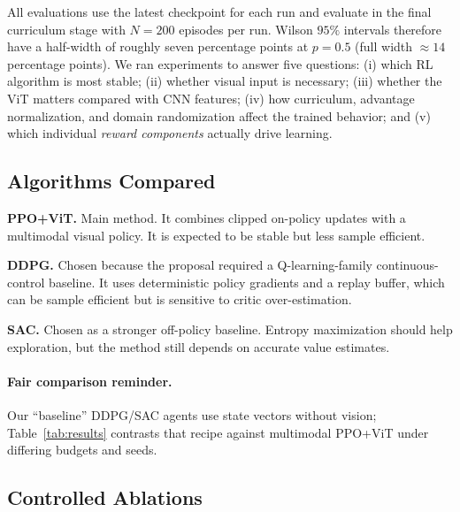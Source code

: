 \documentclass[twocolumn,a4paper,10pt]{article}
\begin{document}
All evaluations use the latest checkpoint for each run and evaluate in the
final curriculum stage with $N\!=\!200$ episodes per run.  Wilson $95\%$
intervals therefore have a half-width of roughly seven percentage points at
$p\!=\!0.5$ (full width $\approx\!14$ percentage points).  We ran experiments
to answer five questions: (i) which RL
algorithm is most stable; (ii) whether visual input is necessary; (iii)
whether the ViT matters compared with CNN features; (iv) how curriculum,
advantage normalization, and domain randomization affect the trained
behavior; and (v) which individual \emph{reward components} actually drive
learning.

\subsection{Algorithms Compared}

\textbf{PPO+ViT.}
Main method.  It combines clipped on-policy updates with a multimodal visual
policy.  It is expected to be stable but less sample efficient.

\textbf{DDPG.}
Chosen because the proposal required a Q-learning-family continuous-control
baseline.  It uses deterministic policy gradients and a replay buffer, which
can be sample efficient but is sensitive to critic over-estimation.

\textbf{SAC.}
Chosen as a stronger off-policy baseline.  Entropy maximization should help
exploration, but the method still depends on accurate value estimates.

\paragraph{Fair comparison reminder.}
Our ``baseline'' DDPG/SAC agents use state vectors without vision; Table~\ref{tab:results}
contrasts that recipe against multimodal PPO+ViT under differing budgets and seeds.

\subsection{Controlled Ablations}
\end{document}

